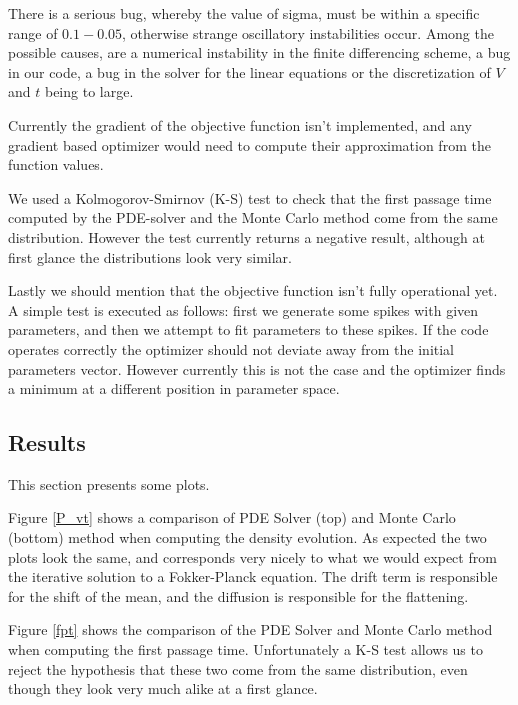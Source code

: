 \documentclass[10pt]{article}
\begin{document}
There is a serious bug, whereby the value of sigma,
must be within a specific range of $0.1 - 0.05$, otherwise strange
oscillatory instabilities occur. Among the possible causes, are a
numerical instability in the finite differencing scheme, a bug in our
code, a bug in the solver for the linear equations or the
discretization of $V$ and $t$ being to large. 

Currently the gradient of the objective function isn't implemented,
and any gradient based optimizer would need to compute their
approximation from the function values. 

We used a Kolmogorov-Smirnov (K-S) test to check that the first
passage time computed by the PDE-solver and the Monte Carlo method
come from the same distribution. However the test currently returns a
negative result, although at first glance the distributions look very
similar. 

Lastly we should mention that the objective function isn't fully
operational yet. A simple test is executed as follows: first we
generate some spikes with given parameters, and then we attempt to fit
parameters to these spikes. If the code operates correctly the
optimizer should not deviate away from the initial parameters vector.
However currently this is not the case and the optimizer finds a
minimum at a different position in parameter space.

\subsection{Results}

This section presents some plots.

Figure \ref{P_vt} shows a comparison of PDE Solver (top) and Monte Carlo
(bottom) method when computing the density evolution. As expected the two plots
look the same, and corresponds very nicely to what we would expect from the
iterative solution to a Fokker-Planck equation. The drift term is responsible for
the shift of the mean, and the diffusion is responsible for the flattening. 

Figure \ref{fpt} shows the comparison of the PDE Solver and Monte
Carlo method when computing the first passage time. Unfortunately a
K-S test allows us to reject the hypothesis that these two come from
the same distribution, even though they look very much alike at a
first glance.
\end{document}
